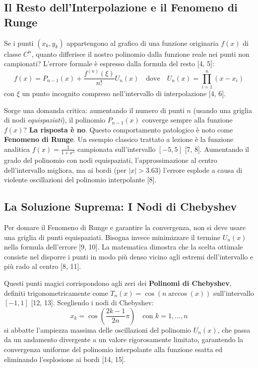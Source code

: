 \documentclass[12pt,a4paper]{article}
\begin{document}
\subsection{Il Resto dell'Interpolazione e il Fenomeno di Runge}
Se i punti $(x_k, y_k)$ appartengono al grafico di una funzione originaria $f(x)$ di classe $C^n$, quanto differisce il nostro polinomio dalla funzione reale nei punti non campionati? L'errore formale è espresso dalla formula del resto [4, 5]:
\begin{equation}
f(x) = P_{n-1}(x) + \frac{f^{(n)}(\xi)}{n!} U_n(x) \quad \text{dove} \quad U_n(x) = \prod_{i=1}^n (x - x_i)
\end{equation}
con $\xi$ un punto incognito compreso nell'intervallo di interpolazione [4, 6].

Sorge una domanda critica: aumentando il numero di punti $n$ (usando una griglia di nodi \textit{equispaziati}), il polinomio $P_{n-1}(x)$ converge sempre alla funzione $f(x)$? \textbf{La risposta è no}. 
Questo comportamento patologico è noto come \textbf{Fenomeno di Runge}. Un esempio classico trattato a lezione è la funzione analitica $f(x) = \frac{1}{1+x^2}$ campionata sull'intervallo $[-5, 5]$ [7, 8]. Aumentando il grado del polinomio con nodi equispaziati, l'approssimazione al centro dell'intervallo migliora, ma ai bordi (per $|x| > 3.63$) l'errore esplode a causa di violente oscillazioni del polinomio interpolante [8].

\subsection{La Soluzione Suprema: I Nodi di Chebyshev}
Per domare il Fenomeno di Runge e garantire la convergenza, non si deve usare una griglia di punti equispaziati. Bisogna invece minimizzare il termine $U_n(x)$ nella formula dell'errore [9, 10]. La matematica dimostra che la scelta ottimale consiste nel disporre i punti in modo più denso vicino agli estremi dell'intervallo e più rado al centro [8, 11].

Questi punti magici corrispondono agli zeri dei \textbf{Polinomi di Chebyshev}, definiti trigonometricamente come $T_n(x) = \cos(n \arccos(x))$ sull'intervallo $[-1, 1]$ [12, 13]. 
Scegliendo i nodi di Chebyshev:
\begin{equation}
x_k = \cos\left(\frac{2k - 1}{2n}\pi\right) \quad \text{con } k = 1, \dots, n
\end{equation}
si abbatte l'ampiezza massima delle oscillazioni del polinomio $U_n(x)$, che passa da un andamento divergente a un valore rigorosamente limitato, garantendo la convergenza uniforme del polinomio interpolante alla funzione esatta ed eliminando l'esplosione ai bordi [14, 15].
\end{document}
